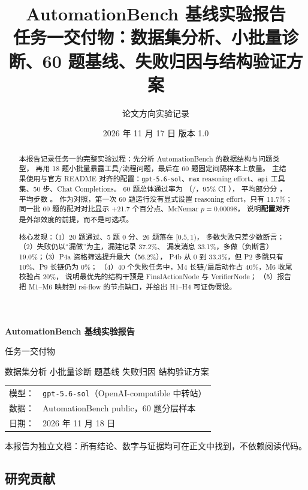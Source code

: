 \documentclass[UTF8,a4paper,11pt]{ctexart}
\title{\textbf{AutomationBench 基线实验报告}\\[6pt]
\large 任务一交付物：数据集分析、小批量诊断、60 题基线、失败归因与结构验证方案}
\author{论文方向实验记录}
\date{2026 年 11 月 17 日 \quad 版本 1.0}
\begin{document}
\begin{titlepage}
\centering
\vspace*{3cm}
{\Huge\bfseries AutomationBench 基线实验报告\par}
\vspace{0.8cm}
{\Large 任务一交付物\par}
\vspace{1.5cm}
{\large 数据集分析 \quad 小批量诊断  题基线 \quad 失败归因 \quad 结构验证方案\par}
\vspace{3cm}
\begin{tabular}{rl}
模型： & \texttt{gpt-5.6-sol}（OpenAI-compatible 中转站） \\
数据： & AutomationBench public，60 题分层样本 \\
日期： & 2026 年 11 月 18 日 \\
\end{tabular}
\vfill
{\small 本报告为独立文档：所有结论、数字与证据均可在正文中找到，不依赖阅读代码。\par}
\end{titlepage}

\begin{abstract}
本报告记录任务一的完整实验过程：先分析 AutomationBench 的数据结构与问题类型，
再用 18 题小批量暴露工具/流程问题，最后在 60 题固定间隔样本上放量。
主结果使用与官方 README 对齐的配置：\texttt{gpt-5.6-sol}、\texttt{max} reasoning
effort、\texttt{api} 工具集、50 步、Chat Completions。
60 题总体通过率为 \MetricPass（\MetricPassCount/\MetricN，95\% CI \MetricPassCI），
平均部分分 \MetricPartial，平均步数 \MetricSteps。
作为对照，第一次 60 题运行没有显式设置 reasoning effort，只有 11.7\%；
同一批 60 题的配对对比显示 +21.7 个百分点、McNemar $p=0.00098$，
说明\textbf{配置对齐}是外部效度的前提，而不是可选项。

核心发现：（1）20 题通过、5 题 0 分、26 题落在 $[0.5,1)$，
多数失败只差少数断言；（2）失败仍以“漏做”为主，漏建记录 37.2\%、
漏发消息 33.1\%，多做（负断言）19.0\%；（3）P4a 资格筛选提升最大（56.2\%），
P4b 从 0 到 33.3\%，但 P2 多跳只有 10\%、P9 长链仍为 0\%；
（4）40 个失败任务中，M4 长链/最后动作占 40\%，M6 收尾校验占 20\%，
说明最优先的结构干预是 FinalActionNode 与 VerifierNode；
（5）报告把 M1--M6 映射到 rsi-flow 的节点缺口，并给出 H1--H4 可证伪假设。
\end{abstract}

\subsection*{研究贡献}
\end{document}
